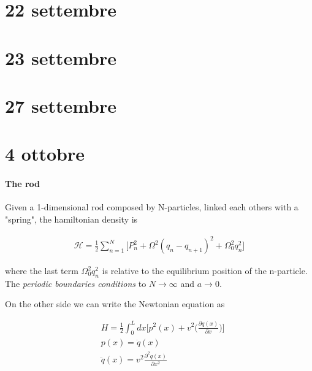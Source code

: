 \documentclass[class=article]{standalone}
\begin{document}
\vspace{30mm} %
\section{22 settembre}

\vspace{30mm} %
\section{23 settembre}

\vspace{30mm} %
\section{27 settembre}


\newpage
\section{4 ottobre}
\paragraph{The rod}
Given a 1-dimensional rod composed by N-particles, linked each others with a "spring", the hamiltonian density is

\begin{equation*}
\begin{split}
\mathcal{H} = \frac{1}{2} \sum_{n=1}^{N} \Big[  P_n^2 + \Omega^2 (q_n - q_{n+1})^2 + \Omega_0^2 q_n^2 \Big]
\end{split}
\end{equation*}

where the last term $\Omega_0^2 q_n^2$ is relative to the equilibrium position of the n-particle.
The \emph{periodic boundaries conditions} to $N \to \infty$ and $a \to 0$.

On the other side we can write the Newtonian equation as 

\begin{equation*}
\begin{split}
& H = \frac{1}{2} \int_{0}^{L} dx \Big[ p^2(x) + v^2 \Big( \frac{\partial q(x)}{\partial x} \Big) \Big] \\
&  p(x) = \dot q(x) \\
&  \ddot q(x) = v^2 \frac{\partial^2 q(x)}{\partial x^2}
\end{split}
\end{equation*}
\end{document}
